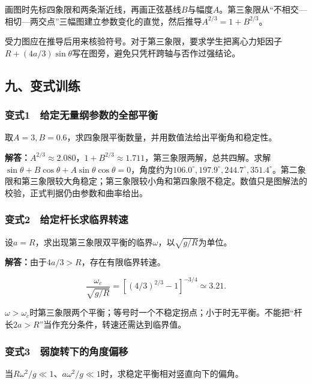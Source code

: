 \documentclass[12pt,a4paper,fontset=fandol]{ctexart}
\begin{document}
画图时先标四象限和两条渐近线，再画正弦基线\(B\)与幅度\(A\)。第三象限从``不相交---相切---两交点''三幅图建立参数变化的直觉，然后推导\(A^{2/3}=1+B^{2/3}\)。

受力图应在推导后用来核验符号。对于第三象限，要求学生把离心力矩因子\(R+(4a/3)\sin\theta\)写在图旁，避免只凭杆跨轴与否作过强结论。

\subsection{九、变式训练}\label{ux4e5dux53d8ux5f0fux8badux7ec3-3}

\subsubsection{变式1　给定无量纲参数的全部平衡}\label{ux53d8ux5f0f1-ux7ed9ux5b9aux65e0ux91cfux7eb2ux53c2ux6570ux7684ux5168ux90e8ux5e73ux8861}

取\(A=3,B=0.6\)，求四象限平衡数量，并用数值法给出平衡角和稳定性。

\textbf{解答：}\(A^{2/3}\approx2.080\)，\(1+B^{2/3}\approx1.711\)，第三象限两解，总共四解。求解\(\sin\theta+B\cos\theta+A\sin\theta\cos\theta=0\)，角度约为\(106.0^\circ,197.9^\circ,244.7^\circ,351.4^\circ\)。第二象限和第三象限较大角稳定；第三象限较小角和第四象限不稳定。数值只是图解法的校验，正式判据仍由参数和曲率给出。

\subsubsection{变式2　给定杆长求临界转速}\label{ux53d8ux5f0f2-ux7ed9ux5b9aux6746ux957fux6c42ux4e34ux754cux8f6cux901f}

设\(a=R\)，求出现第三象限双平衡的临界\(\omega\)，以\(\sqrt{g/R}\)为单位。

\textbf{解答：}由于\(4a/3>R\)，存在有限临界转速。

\[
\frac{\omega_c}{\sqrt{g/R}}
=\left[(4/3)^{2/3}-1\right]^{-3/4}
\simeq3.21.
\]

\(\omega>\omega_c\)时第三象限两个平衡；等号时一个不稳定拐点；小于时无平衡。不能把``杆长\(2a>R\)''当作充分条件，转速还需达到临界值。

\subsubsection{变式3　弱旋转下的角度偏移}\label{ux53d8ux5f0f3-ux5f31ux65cbux8f6cux4e0bux7684ux89d2ux5ea6ux504fux79fb}

当\(R\omega^2/g\ll1\)、\(a\omega^2/g\ll1\)时，求稳定平衡相对竖直向下的偏角。
\end{document}
